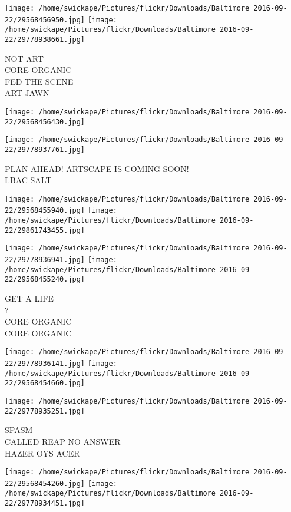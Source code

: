 \documentclass[10pt,letterpaper]{article}
\begin{document}
\texttt{[image: /home/swickape/Pictures/flickr/Downloads/Baltimore 2016-09-22/29568456950.jpg]}
\texttt{[image: /home/swickape/Pictures/flickr/Downloads/Baltimore 2016-09-22/29778938661.jpg]}

NOT ART\\
CORE ORGANIC\\
FED THE SCENE\\
ART JAWN\\
\pagebreak

\texttt{[image: /home/swickape/Pictures/flickr/Downloads/Baltimore 2016-09-22/29568456430.jpg]}

\vspace{0.25in}
\texttt{[image: /home/swickape/Pictures/flickr/Downloads/Baltimore 2016-09-22/29778937761.jpg]}

PLAN AHEAD!  ARTSCAPE IS COMING SOON!\\
LBAC SALT\\
\pagebreak

\texttt{[image: /home/swickape/Pictures/flickr/Downloads/Baltimore 2016-09-22/29568455940.jpg]}
\texttt{[image: /home/swickape/Pictures/flickr/Downloads/Baltimore 2016-09-22/29861743455.jpg]}

\texttt{[image: /home/swickape/Pictures/flickr/Downloads/Baltimore 2016-09-22/29778936941.jpg]}
\texttt{[image: /home/swickape/Pictures/flickr/Downloads/Baltimore 2016-09-22/29568455240.jpg]}

GET A LIFE\\
?\\
CORE ORGANIC\\
CORE ORGANIC\\
\pagebreak

\texttt{[image: /home/swickape/Pictures/flickr/Downloads/Baltimore 2016-09-22/29778936141.jpg]}
\texttt{[image: /home/swickape/Pictures/flickr/Downloads/Baltimore 2016-09-22/29568454660.jpg]}

\vspace{0.25in}
\texttt{[image: /home/swickape/Pictures/flickr/Downloads/Baltimore 2016-09-22/29778935251.jpg]}

SPASM\\
CALLED REAP NO ANSWER\\
HAZER OYS ACER\\
\pagebreak

\texttt{[image: /home/swickape/Pictures/flickr/Downloads/Baltimore 2016-09-22/29568454260.jpg]}
\texttt{[image: /home/swickape/Pictures/flickr/Downloads/Baltimore 2016-09-22/29778934451.jpg]}
\end{document}
